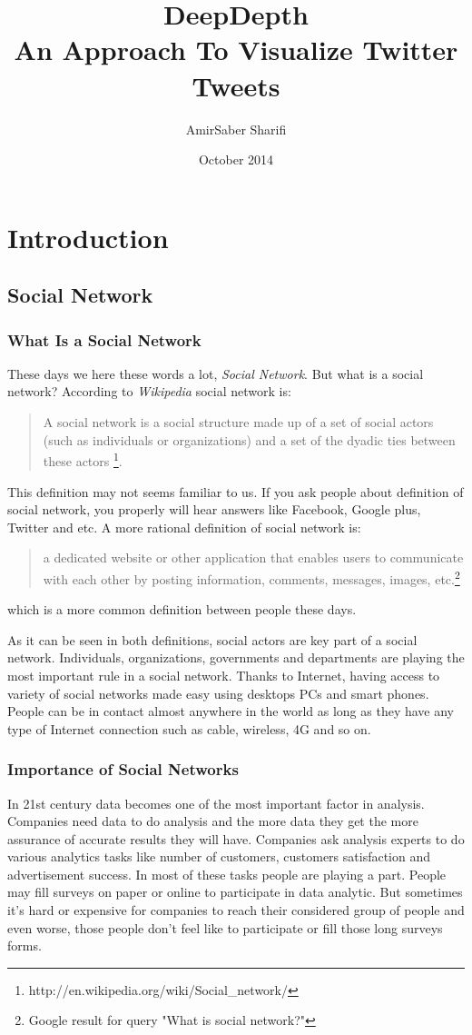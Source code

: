 \documentclass[a4paper,11pt]{report}
\title{DeepDepth \\ An Approach To Visualize Twitter Tweets}
\author{AmirSaber Sharifi}
\date{October 2014}
\begin{document}
\maketitle
\tableofcontents

\chapter{Introduction}
\section{Social Network}
\subsection{What Is a Social Network}
These days we here these words a lot, \emph{Social Network}. But what is a social network? According to \emph{Wikipedia} social network is:

\begin{quote}
A social network is a social structure made up of a set of social actors (such as individuals or organizations) and a set of the dyadic ties between these actors
\footnote{http://en.wikipedia.org/wiki/Social\_network/}.
\end{quote}
This definition may not seems familiar to us. If you ask people about definition of social network, you properly will hear answers like Facebook, Google plus, Twitter and etc. A more rational definition of social network is:

\begin{quote}
a dedicated website or other application that enables users to communicate with each other by posting information, comments, messages, images, etc.\footnote{Google result for query "What is social network?"}
\end{quote}
which is a more common definition between people these days.

As it can be seen in both definitions, social actors are key part of a social network. Individuals, organizations, governments and departments are playing the most important rule in a social network. Thanks to Internet, having access to variety of social networks made easy using desktops PCs and smart phones. People can be in contact almost anywhere in the world as long as they have any type of Internet connection such as cable, wireless, 4G and so on.

\subsection{Importance of Social Networks}
In 21st century data becomes one of the most important factor in analysis. Companies need data to do analysis and the more data they get the more assurance of accurate results they will have. Companies ask analysis experts to do various analytics tasks like number of customers, customers satisfaction and advertisement success. In most of these tasks people are playing a part. People may fill surveys on paper or online to participate in data analytic. But sometimes it's hard or expensive for companies to reach their considered group of people and even worse, those people don't feel like to participate or fill those long surveys forms.
\end{document}
